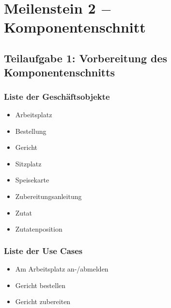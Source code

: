 \section{Meilenstein 2 $-$ Komponentenschnitt}
\label{ms2}

\subsection{Teilaufgabe 1: Vorbereitung des Komponentenschnitts}

\subsubsection{Liste der Gesch\"aftsobjekte}
\label{ldgo}

\begin{itemize}

  \item Arbeitsplatz

  \item Bestellung

  \item Gericht

  \item Sitzplatz

  \item Speisekarte

  \item Zubereitungsanleitung

  \item Zutat

  \item Zutatenposition

\end{itemize}

\subsubsection{Liste der Use Cases}

\begin{itemize}

  \item Am Arbeitsplatz an-/abmelden

  \item Gericht bestellen

  \item Gericht zubereiten

\end{itemize}

